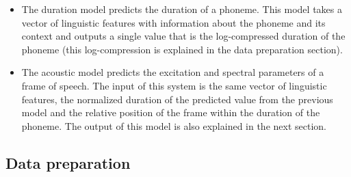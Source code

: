 \begin{itemize}
    \item The duration model predicts the duration of a phoneme. This model takes a vector of linguistic features with information about the phoneme and its context and outputs a single value that is the log-compressed duration of the phoneme (this log-compression is explained in the data preparation section).
    \item The acoustic model predicts the excitation and spectral parameters of a frame of speech. The input of this system is the same vector of linguistic features, the normalized duration of the predicted value from the previous model and the relative position of the frame within the duration of the phoneme. The output of this model is also explained in the next section.
\end{itemize}




\subsection{Data preparation}


